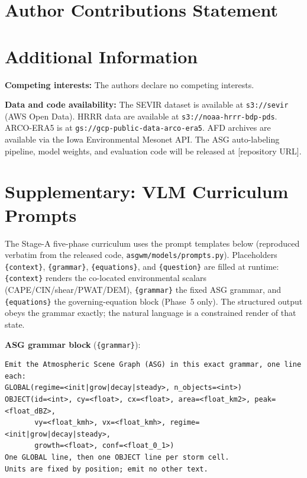 \documentclass[fleqn,10pt]{wlscirep}
\begin{document}
\section*{Author Contributions Statement}

\noindent [To be completed.]

\section*{Additional Information}

\noindent \textbf{Competing interests:} The authors declare no competing interests.

\noindent \textbf{Data and code availability:} The SEVIR dataset is available at \texttt{s3://sevir} (AWS Open Data). HRRR data are available at \texttt{s3://noaa-hrrr-bdp-pds}. ARCO-ERA5 is at \texttt{gs://gcp-public-data-arco-era5}. AFD archives are available via the Iowa Environmental Mesonet API. The ASG auto-labeling pipeline, model weights, and evaluation code will be released at [repository URL].

\section*{Supplementary: VLM Curriculum Prompts}

\noindent The Stage-A five-phase curriculum uses the prompt templates below (reproduced verbatim from the released code, \texttt{asgwm/models/prompts.py}). Placeholders \texttt{\{context\}}, \texttt{\{grammar\}}, \texttt{\{equations\}}, and \texttt{\{question\}} are filled at runtime: \texttt{\{context\}} renders the co-located environmental scalars (CAPE/CIN/shear/PWAT/DEM), \texttt{\{grammar\}} the fixed ASG grammar, and \texttt{\{equations\}} the governing-equation block (Phase~5 only). The structured output obeys the grammar exactly; the natural language is a constrained render of that state.

\noindent\textbf{ASG grammar block} (\texttt{\{grammar\}}):
\begin{lstlisting}
Emit the Atmospheric Scene Graph (ASG) in this exact grammar, one line each:
GLOBAL(regime=<init|grow|decay|steady>, n_objects=<int>)
OBJECT(id=<int>, cy=<float>, cx=<float>, area=<float_km2>, peak=<float_dBZ>,
       vy=<float_kmh>, vx=<float_kmh>, regime=<init|grow|decay|steady>,
       growth=<float>, conf=<float_0_1>)
One GLOBAL line, then one OBJECT line per storm cell.
Units are fixed by position; emit no other text.
\end{lstlisting}
\end{document}
